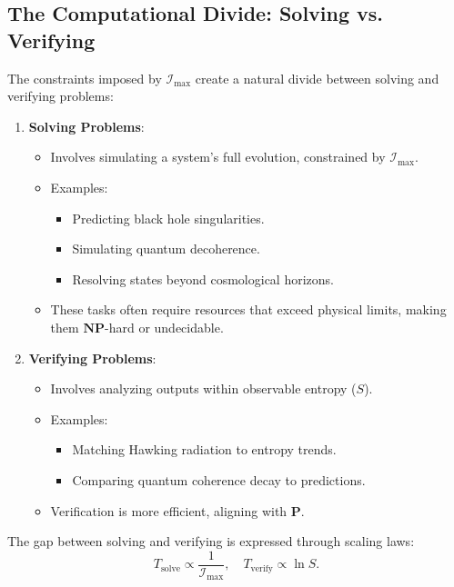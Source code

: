 \documentclass[12pt]{article}
\begin{document}
\subsection{The Computational Divide: Solving vs. Verifying}

The constraints imposed by \(\mathcal{I}_{\text{max}}\) create a natural divide between solving and verifying problems:
\begin{enumerate}
    \item \textbf{Solving Problems}:
    \begin{itemize}
        \item Involves simulating a system’s full evolution, constrained by \(\mathcal{I}_{\text{max}}\).
        \item Examples:
        \begin{itemize}
            \item Predicting black hole singularities.
            \item Simulating quantum decoherence.
            \item Resolving states beyond cosmological horizons.
        \end{itemize}
        \item These tasks often require resources that exceed physical limits, making them \(\mathbf{NP}\)-hard or undecidable.
    \end{itemize}

    \item \textbf{Verifying Problems}:
    \begin{itemize}
        \item Involves analyzing outputs within observable entropy (\(S\)).
        \item Examples:
        \begin{itemize}
            \item Matching Hawking radiation to entropy trends.
            \item Comparing quantum coherence decay to predictions.
        \end{itemize}
        \item Verification is more efficient, aligning with \(\mathbf{P}\).
    \end{itemize}
\end{enumerate}

The gap between solving and verifying is expressed through scaling laws:
\[
T_{\text{solve}} \propto \frac{1}{\mathcal{I}_{\text{max}}}, \quad T_{\text{verify}} \propto \ln S.
\]
\end{document}
